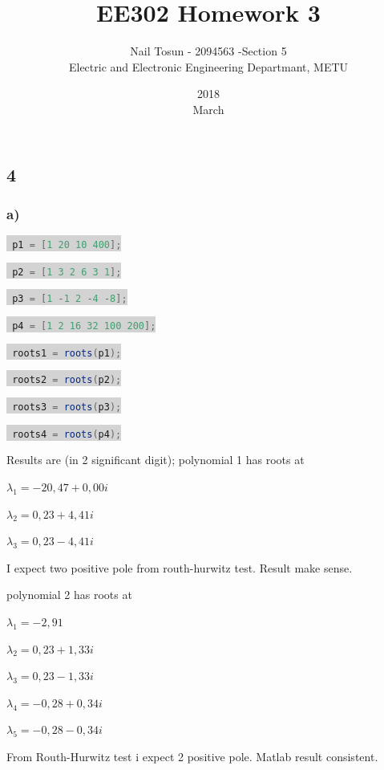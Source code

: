\documentclass[11pt]{article}
\title{EE302 Homework 3}
\date{2018\\ March}
\author{Nail Tosun - 2094563 -Section 5\\ Electric and Electronic Engineering Departmant, METU}
\begin{document}
\maketitle


\subsection*{4}
\subsubsection*{a)}


\newcommand{\inlinecode}[2]{\colorbox{lightgray}{\lstinline[language=#1]$#2$}}

\inlinecode{java}{
p1 = [1 20 10 400];}

\inlinecode{java}{
p2 = [1 3 2 6 3 1];}

\inlinecode{java}{
p3 = [1 -1 2 -4 -8];}

\inlinecode{java}{
p4 = [1 2 16 32 100 200];}

\inlinecode{java}{
roots1 = roots(p1);}

\inlinecode{java}{
roots2 = roots(p2);}

\inlinecode{java}{
roots3 = roots(p3);}

\inlinecode{java}{
roots4 = roots(p4);}
\vspace{5mm} %

Results are (in 2 significant digit);
polynomial 1 has roots at 

$\lambda_1= -20,47 + 0,00i$

$\lambda_2= 0,23 + 4,41i$

$\lambda_3= 0,23 - 4,41i$

I expect two positive pole from routh-hurwitz test. Result make sense.
\vspace{5mm}

polynomial 2 has roots at

$\lambda_1=-2,91$

$\lambda_2=0,23 + 1,33i$

$\lambda_3=0,23 - 1,33i$

$\lambda_4=-0,28 + 0,34i$

$\lambda_5=-0,28 - 0,34i$

From Routh-Hurwitz test i expect 2 positive pole. Matlab result consistent.
\vspace{5mm}
\end{document}
